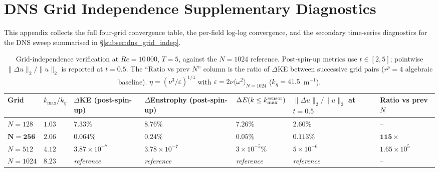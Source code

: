 \chapter{DNS Grid Independence Supplementary Diagnostics}
\label{app:dns_grid_indep_supp}

This appendix collects the full four-grid convergence table, the per-field log-log convergence, and the secondary time-series diagnostics for the DNS sweep summarised in \S\ref{subsec:dns_grid_indep}.

\begin{table}[!htbp]
    \centering
    \caption{Grid-independence verification at $Re=10\,000$, $T=5$, against the $N=1024$ reference. Post-spin-up metrics use $t \in [2, 5]$; pointwise $\|\Delta u\|_2 / \|u\|_2$ is reported at $t=0.5$. The ``Ratio vs prev $N$'' column is the ratio of $\Delta$KE between successive grid pairs ($r^p = 4$ algebraic baseline). $\eta = (\nu^3/\varepsilon)^{1/4}$ with $\varepsilon = 2\nu\langle\omega^2\rangle_{N=1024}$ ($k_\eta = 41.5$~m$^{-1}$).}
    \label{tab:dns_grid_indep}
    \footnotesize
    \setlength{\tabcolsep}{4pt}
    \begin{tabularx}{\textwidth}{
        @{}>{\raggedright\arraybackslash}p{1.4cm}
        >{\centering\arraybackslash}p{1.5cm}
        >{\centering\arraybackslash}p{1.9cm}
        >{\centering\arraybackslash}p{1.9cm}
        >{\centering\arraybackslash}p{2.1cm}
        >{\centering\arraybackslash}p{1.8cm}
        >{\centering\arraybackslash}p{1.8cm}@{}
    }
    \toprule
    \textbf{Grid} & \textbf{$k_{\max}/k_\eta$} & \textbf{$\Delta$KE (post-spin-up)} & \textbf{$\Delta$Enstrophy (post-spin-up)} & \textbf{$\Delta E(k\le k_{\max}^{\rm sensor})$} & \textbf{$\|\Delta u\|_2 / \|u\|_2$ at $t=0.5$} & \textbf{Ratio vs prev $N$} \\
    \midrule
    $N=128$  & $1.03$ & $7.33\%$        & $8.76\%$        & $7.26\%$        & $2.60\%$         & -- \\
    $\mathbf{N=256}$  & $2.06$ & $\mathbf{0.064\%}$ & $\mathbf{0.24\%}$  & $\mathbf{0.05\%}$  & $\mathbf{0.113\%}$ & $\mathbf{115\times}$ \\
    $N=512$  & $4.12$ & $3.87\times 10^{-7}$ & $3.78\times 10^{-7}$ & $3\times 10^{-5}\%$ & $5\times 10^{-6}$ & $1.65\times 10^{5}$ \\
    $N=1024$ & $8.23$ & \emph{reference} & \emph{reference} & \emph{reference} & \emph{reference} & -- \\
    \bottomrule
    \end{tabularx}
\end{table}

